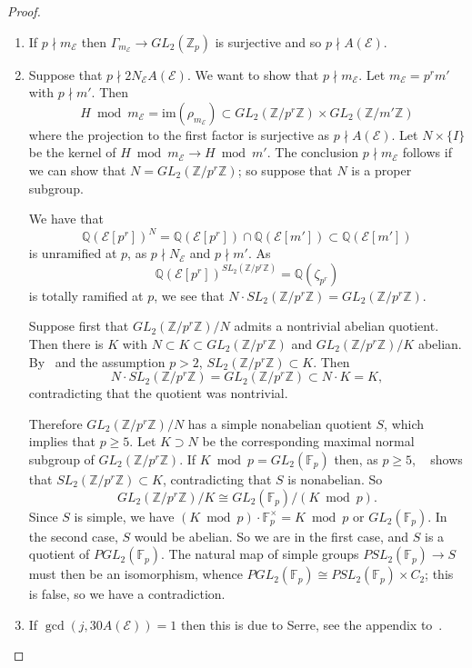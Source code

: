 \documentclass{amsart}
\theoremstyle{plain}
\theoremstyle{remark}
\newcommand{\F}{\mathbb{F}}
\newcommand{\Q}{\mathbb{Q}}
\newcommand{\Z}{\mathbb{Z}}
\newcommand{\E}{\mathcal{E}}
\newcommand{\im}{\mathrm{im}}
\begin{document}
\begin{proof}
\begin{enumerate}
    \item If $p \nmid m_\E$ then $\Gamma_{m_\E} \to GL_2(\Z_p)$ is surjective and so $p \nmid A(\E)$. 
    
    \item Suppose that $p \nmid 2N_\E A(\E)$. We want to show that $p \nmid m_\E$. Let $m_\E = p^rm'$ with $p\nmid m'$. Then 
    \[H \bmod m_\E = \im(\rho_{m_\E}) \subset GL_2(\Z/p^r\Z) \times GL_2(\Z/m'\Z)\]
    where the projection to the first factor is surjective as $p \nmid A(\E)$.
   Let $N\times \{I\}$ be the kernel of $H\bmod m_\E \to H\bmod m'$. The conclusion $p \nmid m_\E$ follows if we can show that $N = GL_2(\Z/p^r\Z)$; so suppose that $N$ is a proper subgroup.
   
   We have that
   \[\Q(\E[p^r])^N = \Q(\E[p^r]) \cap \Q(\E[m'])\subset \Q(\E[m'])\]
    is unramified at $p$, as $p \nmid N_\E$ and $p\nmid m'$. As 
    \[\Q(\E[p^r])^{SL_2(\Z/p^r\Z)} = \Q(\zeta_{p^r})\]
    is totally ramified at $p$, we see that $N \cdot SL_2(\Z/p^r\Z)=GL_2(\Z/p^r\Z)$.

    Suppose first that $GL_2(\Z/p^r\Z)/N$ admits a nontrivial abelian quotient. Then there is $K$ with $N \subset K \subset GL_2(\Z/p^r\Z)$ and $GL_2(\Z/p^r\Z)/K$ abelian. By~\cite[Lemma 7.7]{zywinaExplicitOpenImages2024} and the assumption $p > 2$, $SL_2(\Z/p^r\Z)\subset K$. Then 
    \[N\cdot SL_2(\Z/p^r\Z) = GL_2(\Z/p^r\Z) \subset N\cdot K = K,\] contradicting that the quotient was nontrivial. 

    Therefore $GL_2(\Z/p^r\Z)/N$ has a simple nonabelian quotient $S$, which implies that $p \ge 5$. Let $K\supset N$ be
    the corresponding maximal normal subgroup of $GL_2(\Z/p^r\Z)$. If $K \bmod p = GL_2(\F_p)$ then, as $p \ge 5$,
    ~\cite[IV~Lemma~3]{serre_abelian_1968} shows that $SL_2(\Z/p^r\Z) \subset K$, contradicting that $S$ is
    nonabelian. So
    \[GL_2(\Z/p^r\Z)/K \cong GL_2(\F_p)/(K \bmod p).\] Since $S$ is simple, we have
    $(K\bmod p)\cdot \F_p^\times = K\bmod p$ or $GL_2(\F_p)$. In the second case, $S$ would be abelian. So we are in the
    first case, and $S$ is a quotient of $PGL_2(\F_p)$. The natural map of simple groups $PSL_2(\F_p) \to S$ must then
    be an isomorphism, whence $PGL_2(\F_p) \cong PSL_2(\F_p) \times C_2$; this is false, so we have a contradiction.
    
    \item If $\gcd(j,30A(\E)) = 1$ then this is due to Serre, see the appendix to~\cite{cojocaruSurjectivityGaloisRepresentations2005}. 


\end{enumerate}
\end{proof}
\end{document}
